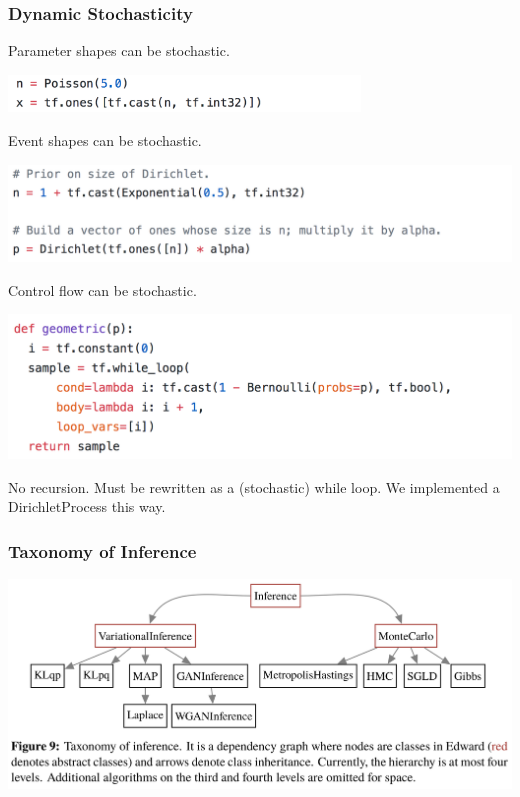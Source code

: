 \documentclass[10pt,
               xcolor={usenames,dvipsnames},
               hyperref={colorlinks,linktoc=all,citecolor=Plum,linkcolor=MidnightBlue,urlcolor=MidnightBlue},noamssymb]{beamer}
\begin{document}
\begin{frame}
\frametitle{Dynamic Stochasticity}
Parameter shapes can be stochastic.

\begin{center}
\hspace{-11em}
\vspace{-1.0ex}
\includegraphics[width=0.7\textwidth]{img/poisson.png}
\end{center}

Event shapes can be stochastic.

\begin{center}
\vspace{-0.5ex}
\includegraphics[width=1.0\textwidth]{img/dirichlet.png}
\vspace{-2ex}
\end{center}

Control flow can be stochastic.

\begin{center}
\vspace{-0.5ex}
\includegraphics[width=1.0\textwidth]{img/geometric.png}
\vspace{-2ex}
\end{center}

No recursion. Must be rewritten as a (stochastic) while loop.
We implemented a DirichletProcess this way.
\end{frame}

\begin{frame}
\frametitle{Taxonomy of Inference}
\begin{center}
\includegraphics[width=1.0\textwidth]{img/taxonomy.png}
\end{center}
\end{frame}
\end{document}
